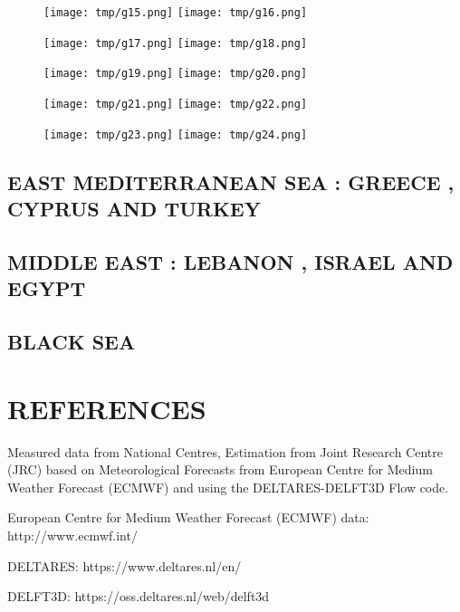 \documentclass[a4paper]{article}
\renewcommand{\\}{\ {\large\textperiodcentered}\ }
\renewcommand{\\}{\ {\large\textperiodcentered}\ }
\begin{document}
\begin{figure}[h]
\centerline{
\texttt{[image: tmp/g15.png]}
\texttt{[image: tmp/g16.png]}
}
\end{figure}
\begin{figure}[h]
\centerline{
\texttt{[image: tmp/g17.png]}
\texttt{[image: tmp/g18.png]}
}
\end{figure}

\begin{figure}[h]
\centerline{
\texttt{[image: tmp/g19.png]}
\texttt{[image: tmp/g20.png]}
}
\end{figure}
\begin{figure}[h]
\centerline{
\texttt{[image: tmp/g21.png]}
\texttt{[image: tmp/g22.png]}
}
\end{figure}

\begin{figure}[h]
\centerline{
\texttt{[image: tmp/g23.png]}
\texttt{[image: tmp/g24.png]}
}
\end{figure}

\newpage

\subsection*{EAST MEDITERRANEAN SEA : GREECE , CYPRUS AND TURKEY}

\newpage
\subsection*{MIDDLE EAST : LEBANON , ISRAEL AND EGYPT}

\newpage
\subsection*{BLACK SEA}


\newpage
\section*{REFERENCES}

Measured data from National Centres, Estimation from Joint Research Centre (JRC) based on Meteorological Forecasts from European Centre for Medium Weather Forecast (ECMWF) and using the DELTARES-DELFT3D Flow code.

European Centre for Medium Weather Forecast (ECMWF) data: http://www.ecmwf.int/

DELTARES: https://www.deltares.nl/en/

DELFT3D: https://oss.deltares.nl/web/delft3d
\end{document}
